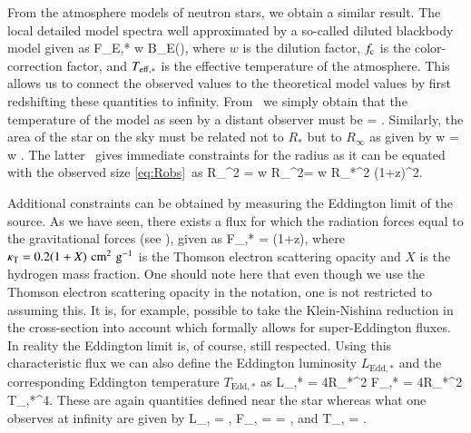 From the atmosphere models of neutron stars, we obtain a similar result.
The local detailed model spectra  well approximated by a so-called diluted blackbody model given as
\be
F_{E,*} \approx \pi w B_E(\fc \Teffs),
\ee
where $w$ is the dilution factor, $f_{\mathrm{c}}$ is the color-correction factor, and $T_{\mathrm{eff},*}$ is the effective temperature of the atmosphere.
This allows us to connect the observed values to the theoretical model values by first redshifting these quantities to infinity.
From \ we simply obtain that the temperature of the model as seen by a distant observer must be
\be
\fc \Teffi = \fc {}.
\ee
Similarly, the area of the star on the sky must be related not to $R_*$ but to $R_{\infty}$ as given by 
\be\label{eq:Rmod}
w = w .
\ee
The latter \ gives immediate constraints for the radius as it can be equated with the observed size \eqref{eq:Robs}\ as\cite{Penninx89, vParadijs90}
\be
R_{}^2 =  w R_{\infty}^2= w R_*^2 (1+z)^2.
\ee

Additional constraints can be obtained by measuring the Eddington limit of the source.
As we have seen, there exists a flux for which the radiation forces equal to the gravitational forces (see ), given as 
\be
F_{,*} =  (1+z),
\ee
where $\kappa_{\mathrm{T}} = 0.2(1+X)\,\, \mathrm{cm}^2\,\, \mathrm{g}^{-1}$ is the Thomson electron scattering opacity and $X$ is the hydrogen mass fraction.
One should note here that even though we use the Thomson electron scattering opacity in the notation, one is not restricted to assuming this.
It is, for example, possible to take the Klein-Nishina reduction in the cross-section into account which formally allows for super-Eddington fluxes.\cite{SPW12}
In reality the Eddington limit is, of course, still respected.
Using this characteristic flux we can also define the Eddington luminosity $L_{\mathrm{Edd},*}$ and the corresponding Eddington temperature $T_{\mathrm{Edd},*}$ as
\be
L_{,*} =  4\pi R_*^2 F_{,*} = 4\pi R_*^2 \sigmaSB T_{,*}^4.
\ee
These are again quantities defined near the star whereas what one observes at infinity are given by
\be
L_{,\infty} = ,
\ee
\be
F_{,\infty} =  =  ,
\ee
and
\be
T_{,\infty} = .
\ee

